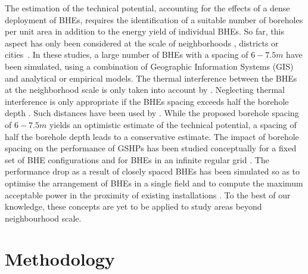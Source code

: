 The estimation of the technical potential, accounting for the effects of a dense deployment of BHEs, requires the identification of a suitable number of boreholes per unit area in addition to the energy yield of individual BHEs. 
So far, this aspect has only been considered at the scale of neighborhoods \cite{miglani_methodology_2018}, districts \cite{zhang_influence_2015} or cities~\cite{schiel_gis-based_2016}.
In these studies, a large number of BHEs with a spacing of $6-7.5m$ have been simulated, using a combination of Geographic Information Systems (GIS) and analytical or empirical models. 
The thermal interference between the BHEs at the neighborhood scale is only taken into account by \citet{miglani_methodology_2018}.
Neglecting thermal interference is only appropriate if the BHEs spacing exceeds half the borehole depth \cite{pahud_geothermal_2002}. 
Such distances have been used by \citet{stegnar_framework_2019, wagner_erdsondenpotenzial_2014}.
While the proposed borehole spacing of $6-7.5m$ yields an optimistic estimate of the technical potential, a spacing of half the borehole depth leads to a conservative estimate.
The impact of borehole spacing on the performance of GSHPs has been studied conceptually for a fixed set of BHE configurations \cite{signorelli_geoscientific_2004, vitriu_3d_2019} and for BHEs in an infinite regular grid \cite{rivera_increased_2017, fasci_analysis_2019}. 
The performance drop as a result of closely spaced BHEs has been simulated so as to optimise the arrangement of BHEs in a single field \cite{bayer_strategic_2014} and to compute the maximum acceptable power in the proximity of existing installations \cite{attard_novel_2020}. 
To the best of our knowledge, these concepts are yet to be applied to study areas beyond neighbourhood scale.

\section{Methodology}

